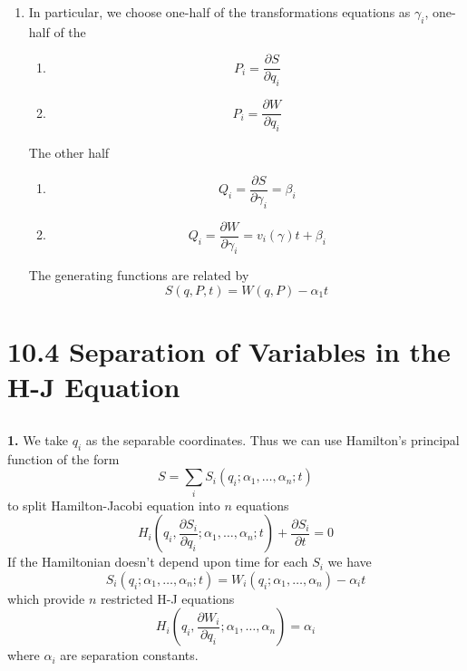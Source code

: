 \documentclass{article}
\begin{document}
\begin{enumerate}
		\item In particular, we choose one-half of the transformations equations as $\gamma_i$, one-half of the
		\begin{enumerate}
			\item 
			\[
			P_i = \frac{\partial S}{\partial q_i}
			\]
			\item
			\[
			P_i = \frac{\partial W}{\partial q_i}
			\]
		\end{enumerate}
		The other half
		\begin{enumerate}
			\item 
			\[
			Q_i = \frac{\partial S}{\partial \gamma_i} = \beta_i
			\]
			\item
			\[
			Q_i = \frac{\partial W}{\partial \gamma_i} = v_i(\gamma)t + \beta_i
			\]
		\end{enumerate}
		The generating functions are related by
		\[
		S(q, P, t) = W(q, P) - \alpha_1 t
		\]
		
	\end{enumerate}
	\section*{10.4 Separation of Variables in the H-J Equation}
	
	\subsection*{}
	\textbf{1.} We take $q_i$ as the separable coordinates.
	Thus we can use Hamilton's principal function of the form
	\begin{equation*}
		S = \sum_i S_i(q_i; \alpha_1, \dots, \alpha_n; t)
	\end{equation*}
	to split Hamilton-Jacobi equation into $n$ equations
	\begin{equation*}
		H_i\left(q_i, \frac{\partial S_i}{\partial q_i}; \alpha_1, \dots, \alpha_n; t\right) + \frac{\partial S_i}{\partial t} = 0
	\end{equation*}
	If the Hamiltonian doesn't depend upon time for each $S_i$ we have
	\begin{equation*}
		S_i(q_i; \alpha_1, \dots, \alpha_n; t) = W_i(q_i; \alpha_1, \dots, \alpha_n) - \alpha_i t
	\end{equation*}
	which provide $n$ restricted H-J equations
	\begin{equation*}
		H_i\left(q_i, \frac{\partial W_i}{\partial q_i}; \alpha_1, \dots, \alpha_n\right) = \alpha_i
	\end{equation*}
	where $\alpha_i$ are separation constants.
	
\end{document}
